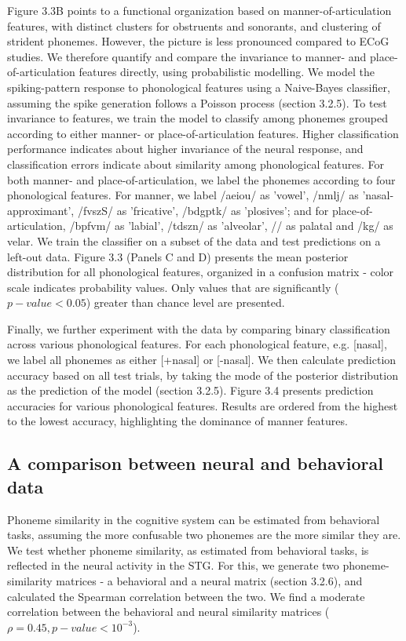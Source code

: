 Figure 3.3B points to a functional organization based on manner-of-articulation features, with distinct clusters for obstruents and sonorants, and clustering of strident phonemes. However, the picture is less pronounced compared to ECoG studies. We therefore quantify and compare the invariance to manner- and place-of-articulation features directly, using probabilistic modelling. We model the spiking-pattern response to phonological features using a Naive-Bayes classifier, assuming the spike generation follows a Poisson process (section 3.2.5). To test invariance to features, we train the model to classify among phonemes grouped according to either manner- or place-of-articulation features. Higher classification performance indicates about higher invariance of the neural response, and classification errors indicate about similarity among phonological features. For both manner- and place-of-articulation, we label the phonemes according to four phonological features. For manner, we label /aeiou/ as 'vowel', /nmlj/ as 'nasal-approximant', /fvszS/ as 'fricative', /bdgptk/ as 'plosives'; and for place-of-articulation, /bpfvm/ as 'labial', /tdszn/ as 'alveolar', // as palatal and /kg/ as velar. We train the classifier on a subset of the data and test predictions on a left-out data. Figure 3.3 (Panels C and D) presents the mean posterior distribution for all phonological features, organized in a confusion matrix - color scale indicates probability values. Only values that are significantly ($p-value<0.05$) greater than chance level are presented.

Finally, we further experiment with the data by comparing binary classification across various phonological features. For each phonological feature, e.g. [nasal], we label all phonemes as either [+nasal] or [-nasal]. We then calculate prediction accuracy based on all test trials, by taking the mode of the posterior distribution as the prediction of the model (section 3.2.5). Figure 3.4 presents prediction accuracies for various phonological features. Results are ordered from the highest to the lowest accuracy, highlighting the dominance of manner features.


\subsection{A comparison between neural and behavioral data}
Phoneme similarity in the cognitive system can be estimated from behavioral tasks, assuming the more confusable two phonemes are the more similar they are. We test whether phoneme similarity, as estimated from behavioral tasks, is reflected in the neural activity in the STG. For this, we generate two phoneme-similarity matrices - a behavioral and a neural matrix (section 3.2.6), and calculated the Spearman correlation between the two. We find a moderate correlation between the behavioral and neural similarity matrices ($\rho = 0.45, p-value < 10^{-3}$).


